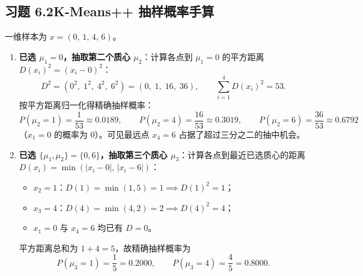 \subsection*{习题 6.2\quad K-Means++ 抽样概率手算}
一维样本为 $x = (0,\, 1,\, 4,\, 6)$。
\begin{enumerate}[label=(\arabic*), leftmargin=1.8em]
  \item \textbf{已选 $\mu_1 = 0$，抽取第二个质心 $\mu_2$}：计算各点到 $\mu_1 = 0$ 的平方距离 $D(x_i)^2 = (x_i - 0)^2$：
  \[
    D^2 = (0^2,\; 1^2,\; 4^2,\; 6^2) = (0,\; 1,\; 16,\; 36), \qquad \sum_{i=1}^4 D(x_i)^2 = 53.
  \]
  按平方距离归一化得精确抽样概率：
  \[
    P(\mu_2 = 1) = \frac{1}{53} \approx 0.0189, \qquad
    P(\mu_2 = 4) = \frac{16}{53} \approx 0.3019, \qquad
    P(\mu_2 = 6) = \frac{36}{53} \approx 0.6792
  \]
  （$x_1 = 0$ 的概率为 $0$）。可见最远点 $x_4 = 6$ 占据了超过三分之二的抽中机会。

  \item \textbf{已选 $\{\mu_1, \mu_2\} = \{0, 6\}$，抽取第三个质心 $\mu_3$}：计算各点到最近已选质心的距离 $D(x_i) = \min(|x_i - 0|,\, |x_i - 6|)$：
  \begin{itemize}
    \item $x_2 = 1$：$D(1) = \min(1, 5) = 1 \implies D(1)^2 = 1$；
    \item $x_3 = 4$：$D(4) = \min(4, 2) = 2 \implies D(4)^2 = 4$；
    \item $x_1 = 0$ 与 $x_4 = 6$ 均已有 $D = 0$。
  \end{itemize}
  平方距离总和为 $1 + 4 = 5$，故精确抽样概率为
  \[
    P(\mu_3 = 1) = \frac{1}{5} = \mathbf{0.2000}, \qquad
    P(\mu_3 = 4) = \frac{4}{5} = \mathbf{0.8000}.
  \]
\end{enumerate}

